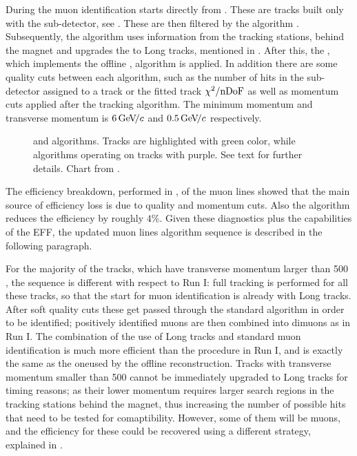 During \runone the muon identification starts directly from \veloTracks. These are tracks built only with
the \velo sub-detector, see . These \veloTracks are then filtered by the \mvm algorithm
\cite{LHCb-PUB-2011-017}. Subsequently, the \FwD algorithm uses information from the tracking stations, behind
the magnet and upgrades the \veloTracks to Long tracks, mentioned in . After this, the
\isMuon, which implements the offline \muonID, algorithm is applied. In addition there are some quality cuts
between each algorithm, such as the number of hits in the \velo sub-detector assigned to a track or the fitted
track $\chi^2/\rm nDoF$ as well as momentum cuts applied after the \FwD tracking algorithm. The minimum momentum
and transverse momentum is $6 {\mathrm{\,Ge\kern -0.1em V\!/}c}$ and $0.5 {\mathrm{\,Ge\kern -0.1em V\!/}c}$ respectively.

\begin{figure}[t]
  \centering
  \scalebox{0.97}{}
  \scalebox{0.97}{}
 \caption{\runone and \runtwo \hltone algorithms. Tracks are highlighted with green color, while algorithms
           operating on tracks with purple. See text for further details. Chart from \cite{kevinThesis}.}
  \label{hlt1_algo_seq}
\end{figure}

The efficiency breakdown, performed in \cite{kevinThesis}, of the \runone \hltone muon lines showed that the
main source of efficiency loss is due to quality and momentum cuts. Also the \mvm algorithm reduces the
efficiency by roughly $4\%$. Given these diagnostics plus the \runtwo capabilities of the EFF, the updated
\hltone muon lines algorithm sequence is described in the following paragraph.

For the majority of the tracks, which have transverse momentum larger than 500 \mevc, the sequence is different with respect to
Run I: full tracking is performed for all these tracks, so that the start for muon identification is already with Long tracks.
After soft quality cuts these get passed through the standard \isMuon algorithm in order to be identified;
positively identified muons are then combined into dimuons as in Run I.
The combination of the use of Long tracks and standard muon identification is much more efficient than the
procedure in Run I, and is exactly the same as the oneused by the offline reconstruction.
Tracks with transverse momentum smaller than 500 \mevc cannot be immediately upgraded to Long tracks
for timing reasons; as their lower momentum requires larger search regions in the tracking stations
behind the magnet, thus increasing the number of possible hits that need to be tested for comaptibility.
However, some of them will be muons, and the efficiency for these could be recovered using a different strategy,
explained in .
